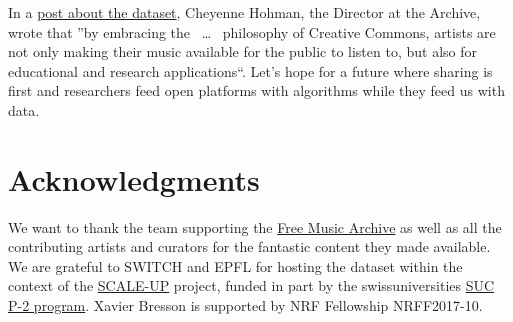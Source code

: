 \documentclass{article}
\begin{document}
In a \href{https://freemusicarchive.org/member/cheyenne_h/blog/FMA_Dataset_for_Researchers}{post about the dataset}, Cheyenne Hohman, the Director at the Archive, wrote that ''by embracing the
~\ldots~%
philosophy of Creative Commons, artists are not only making their music available for the public to listen to, but also for educational and research applications``.
Let's hope for a future where sharing is first and researchers feed open platforms with algorithms while they feed us with data.


\section{Acknowledgments}


We want to thank the team supporting the \href{https://freemusicarchive.org}{Free Music Archive} as well as all the contributing artists and curators for the fantastic content they made available.
We are grateful to SWITCH and EPFL for hosting the dataset within the context of the \href{https://projects.switch.ch/scale-up}{SCALE-UP} project, funded in part by the swissuniversities \href{http://www.swissuniversities.ch/isci}{SUC P-2 program}.
Xavier Bresson is supported by NRF Fellowship NRFF2017-10.


\end{document}
